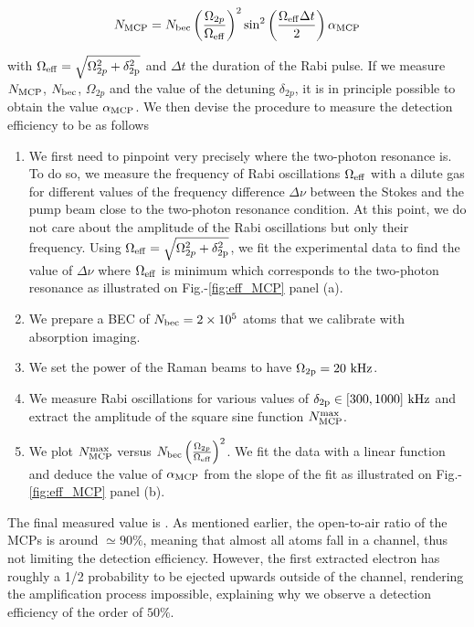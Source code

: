 \begin{equation}
    N_{\rm{MCP}}=N_{\rm{bec}} \left(\frac{\Omega_{2 p}}{\Omega_{\rm{eff}}}\right)^{2} \sin ^{2}\left(\frac{\Omega_{\rm{eff}}  \Delta t}{2}\right) \alpha_{\rm{MCP}}
\end{equation}

\noindent with  $\Omega_{\rm{eff}}= \sqrt{\Omega_{2p}^2 + \delta_{\rm{2p}}^2}$ and $\Delta t$ the duration of the Rabi pulse. If we measure $N_{\rm{MCP}}$, $N_{\rm{bec}}$, $\Omega_{2p}$ and the value of the detuning  $\delta_{2p}$, it is in principle possible to obtain the value $\alpha_{\rm{MCP}}$. We then devise the procedure to measure the detection efficiency to be as follows

\begin{enumerate}
    \item We first need to pinpoint very precisely where the two-photon resonance is. To do so, we measure the frequency of Rabi oscillations $\Omega_{\rm{eff}}$ with a dilute gas for different values of the frequency difference $\Delta \nu$ between the Stokes and the pump beam close to the two-photon resonance condition. At this point, we do not care about the amplitude of the Rabi oscillations but only their frequency. Using $\Omega_{\rm{eff}}= \sqrt{\Omega_{2p}^2 + \delta_{\rm{2p}}^2}$, we fit the experimental data to find the value of $\Delta \nu$ where $\Omega_{\rm{eff}}$ is minimum which corresponds to the two-photon resonance as illustrated on Fig.-\ref{fig:eff_MCP} panel (a).
    \item We prepare a BEC of $N_{\rm{bec}} = 2 \times 10^5$ atoms that we calibrate with absorption imaging.
    \item We set the power of the Raman beams to have $\Omega_{\rm{2p}}=20 \ \rm{kHz}$.
    \item We measure Rabi oscillations for various values of $\delta_{\rm{2p}} \in [300,1000] \ \rm{kHz}$ and extract the amplitude of the square sine function $N^{\rm{max}}_{\rm{MCP}}$.
    \item We plot $N^{\rm{max}}_{\rm{MCP}}$ versus $N_{\rm{bec}} \left(\frac{\Omega_{2 p}}{\Omega_{\rm{eff}}}\right)^{2}$. We fit the data with a linear function and deduce the value of $\alpha_{\rm{MCP}}$ from the slope of the fit as illustrated on Fig.-\ref{fig:eff_MCP} panel (b).
\end{enumerate}

\noindent The final measured value is . As mentioned earlier, the open-to-air ratio of the MCPs is around $\simeq 90 \%$, meaning that almost all atoms fall in a channel, thus not limiting the detection efficiency. However, the first extracted electron has roughly a 1/2 probability to be ejected upwards outside of the channel, rendering the amplification process impossible, explaining why we observe a detection efficiency of the order of $50 \%$.

